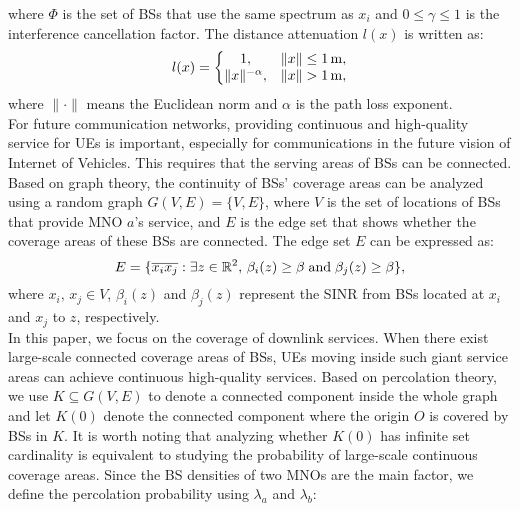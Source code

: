 \documentclass[final]{IEEEtran}
\begin{document}
where $\Phi$ is the set of BSs that use the same spectrum as $x_i$ and $0\leq \gamma \leq 1$ is the interference cancellation factor. The distance attenuation $l(x)$ is written
as:
\begin{equation}
    l(x)=\left\{\begin{matrix}
 1, &\|x\|\leq 1\, {\rm m},\\
\|x\|^{-\alpha}, &\|x\|>1\,{\rm m},
\end{matrix}\right.
\end{equation}
where $\|\cdot\|$ means the Euclidean norm and $\alpha$ is the path loss exponent. \\%
\indent For future communication networks, providing continuous and high-quality service for UEs is important, especially for communications in the future vision of Internet of Vehicles. This requires that the serving areas of BSs can be connected. Based on graph theory, the continuity of BSs' coverage areas can be analyzed using a random graph $G(V,E)=\{V,E\}$, where $V$ is the set of locations of BSs that provide MNO $a$'s service, and $E$ is the edge set that shows whether the coverage areas of these BSs are connected. The edge set $E$ can be expressed as:
\begin{equation}
    E=\{\overline{x_i x_j}: \exists z\in \mathbb{R}^2,\, \beta_i(z)\geq\beta\;{\rm and}\;\beta_j(z)\geq\beta\},
\label{edgeset}
\end{equation}
where $x_i,\,x_j\in V$, $\beta_i(z)$ and $\beta_j(z)$ represent the SINR from BSs located at $x_i$ and $x_j$ to $z$, respectively.\\%
\indent In this paper, we focus on the coverage of downlink services. When there exist large-scale connected coverage areas of BSs, UEs moving inside such giant service areas can achieve continuous high-quality services. Based on percolation theory, we use $K\subseteq G(V,E)$ to denote a connected component inside the whole graph and let $K(0)$ denote the connected component where the origin $O$ is covered by BSs in $K$. It is worth noting that analyzing whether $K(0)$ has infinite set cardinality is equivalent to studying the probability of large-scale continuous coverage areas. Since the BS densities of two MNOs are the main factor, we define the percolation probability using $\lambda_a$ and $\lambda_b$:
\end{document}
